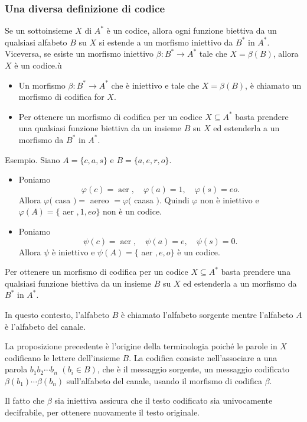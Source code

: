 \subsubsection{Una diversa definizione di codice}
Se un sottoinsieme $X$ di $A^{*}$ è un codice, allora ogni funzione biettiva da un qualsiasi alfabeto $B$ su $X$ si estende a un morfismo iniettivo da $B^{*}$ in $A^{*}$. Viceversa, se esiste un morfismo iniettivo $\beta: B^{*} \rightarrow A^{*}$ tale che $X=\beta(B)$, allora $X$ è un codice.ù
\begin{itemize}
    \item  Un morfismo $\beta: B^{*} \rightarrow A^{*}$ che è iniettivo e tale che $X=\beta(B)$, è chiamato un morfismo di codifica for $X$.
    \item Per ottenere un morfismo di codifica per un codice $X \subseteq A^{*}$ basta prendere una qualsiasi funzione biettiva da un insieme $B$ su $X$ ed estenderla a un morfismo da $B^{*}$ in $A^{*}$.
\end{itemize}
Esempio. Siano $A=\{c, a, s\}$ e $B=\{a, e, r, o\}$.
\begin{itemize}
    \item Poniamo
$$
\varphi(c)=\operatorname{aer}, \quad \varphi(a)=1, \quad \varphi(s)=e o .
$$
Allora $\varphi($ casa $)=$ aereo $=\varphi($ caasa $)$. Quindi $\varphi$ non è iniettivo e $\varphi(A)=\{$ aer $, 1, e o\}$ non è un codice.
\item Poniamo
$$
\psi(c)=\operatorname{aer}, \quad \psi(a)=e, \quad \psi(s)=0 .
$$
Allora $\psi$ è iniettivo e $\psi(A)=\{$ aer $, e, o\}$ è un codice.
\end{itemize}

Per ottenere un morfismo di codifica per un codice $X \subseteq A^{*}$ basta prendere una qualsiasi funzione biettiva da un insieme $B$ su $X$ ed estenderla a un morfismo da $B^{*}$ in $A^{*}$.

In questo contesto, l'alfabeto $B$ è chiamato l'alfabeto sorgente mentre l'alfabeto $A$ è l'alfabeto del canale.

La proposizione precedente è l'origine della terminologia poiché le parole in $X$ codificano le lettere dell'insieme $B$. La codifica consiste nell'associare a una parola $b_{1} b_{2} \cdots b_{n}$ $\left(b_{i} \in B\right)$, che è il messaggio sorgente, un messaggio codificato $\beta\left(b_{1}\right) \cdots \beta\left(b_{n}\right)$ sull'alfabeto del canale, usando il morfismo di codifica $\beta$.

Il fatto che $\beta$ sia iniettiva assicura che il testo codificato sia univocamente decifrabile, per ottenere nuovamente il testo originale.

